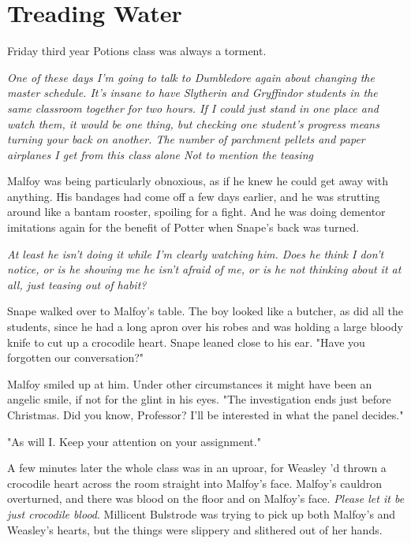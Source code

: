 
\chapter{Treading Water}

Friday third year Potions class was always a torment.

\emph{One of these days I'm going to talk to Dumbledore again about changing the master schedule. It's insane to have Slytherin and Gryffindor students in the same classroom together for two hours. If I could just stand in one place and watch them, it would be one thing, but checking one student's progress means turning your back on another. The number of parchment pellets and paper airplanes I get from this class alone{\el} Not to mention the teasing{\el}}

Malfoy was being particularly obnoxious, as if he knew he could get away with anything. His bandages had come off a few days earlier, and he was strutting around like a bantam rooster, spoiling for a fight. And he was doing dementor imitations again for the benefit of Potter when Snape's back was turned.

\emph{At least he isn't doing it while I'm clearly watching him. Does he think I don't notice, or is he showing me he isn't afraid of me, or is he not thinking about it at all, just teasing out of habit?}

Snape walked over to Malfoy's table. The boy looked like a butcher, as did all the students, since he had a long apron over his robes and was holding a large bloody knife to cut up a crocodile heart. Snape leaned close to his ear. "Have you forgotten our conversation?"

Malfoy smiled up at him. Under other circumstances it might have been an angelic smile, if not for the glint in his eyes. "The investigation ends just before Christmas. Did you know, Professor? I'll be interested in what the panel decides."

"As will I. Keep your attention on your assignment."

A few minutes later the whole class was in an uproar, for Weasley 'd thrown a crocodile heart across the room straight into Malfoy's face. Malfoy's cauldron overturned, and there was blood on the floor and on Malfoy's face. \emph{Please let it be just crocodile blood}. Millicent Bulstrode was trying to pick up both Malfoy's and Weasley's hearts, but the things were slippery and slithered out of her hands.

